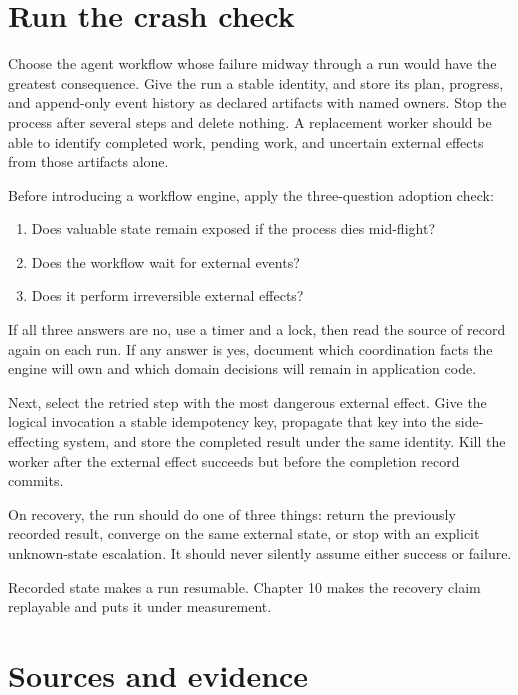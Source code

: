\hypertarget{run-the-crash-check}{%
\section{Run the crash check}\label{run-the-crash-check}}

Choose the agent workflow whose failure midway through a run would have the greatest consequence. Give the run a stable identity, and store its plan, progress, and append-only event history as declared artifacts with named owners. Stop the process after several steps and delete nothing. A replacement worker should be able to identify completed work, pending work, and uncertain external effects from those artifacts alone.


Before introducing a workflow engine, apply the three-question adoption check:

\begin{enumerate}
\def\labelenumi{\arabic{enumi}.}
\tightlist
\item
  Does valuable state remain exposed if the process dies mid-flight?
\item
  Does the workflow wait for external events?
\item
  Does it perform irreversible external effects?
\end{enumerate}

If all three answers are no, use a timer and a lock, then read the source of record again on each run. If any answer is yes, document which coordination facts the engine will own and which domain decisions will remain in application code.

Next, select the retried step with the most dangerous external effect. Give the logical invocation a stable idempotency key, propagate that key into the side-effecting system, and store the completed result under the same identity. Kill the worker after the external effect succeeds but before the completion record commits.

On recovery, the run should do one of three things: return the previously recorded result, converge on the same external state, or stop with an explicit unknown-state escalation. It should never silently assume either success or failure.

Recorded state makes a run resumable. Chapter 10 makes the recovery claim replayable and puts it under measurement.

\section*{Sources and evidence}


